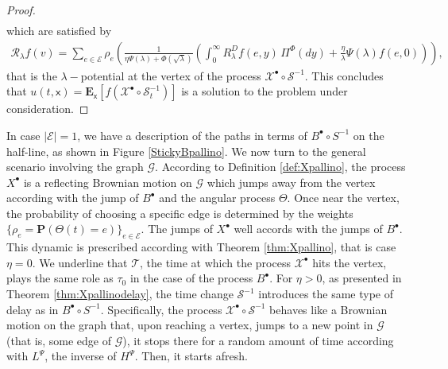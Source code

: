 \documentclass[11pt,a4paper]{article}
\theoremstyle{plain}
\theoremstyle{definition}
\theoremstyle{remark}
\begin{document}
\begin{proof}
\begin{align*}
			\end{align*}
			which are satisfied by
			\begin{align*}
				\mathcal{R}_\lambda f(v)= \sum_{e\in \mathcal{E}} \rho_e \left(\frac{1}{\eta \Psi(\lambda) +\Phi(\sqrt \lambda)} \left( \int_0^\infty R_\lambda^D f(e,y) \, \Pi^\Phi(dy) + \frac{\eta}{\lambda} \Psi(\lambda)f(e,0) \right)\right),
			\end{align*}
			that is the $\lambda-$potential at the vertex of the process $\mathcal{X}^\bullet \circ \mathcal{S}^{-1}$. This concludes that $u(t,\mathsf{x})=\mathbf{E}_\mathsf{x}[f(\mathcal{X}^\bullet \circ \mathcal{S}^{-1}_t)]$ is a solution to the problem under consideration.
		\end{proof}
		
		
		In case \( \vert \mathcal{E} \vert = 1 \), we have a description of the paths in terms of \( B^\bullet \circ S^{-1} \) on the half-line, as shown in Figure \ref{StickyBpallino}. We now turn to the general scenario involving the graph \( \mathcal{G} \). According to Definition \ref{def:Xpallino}, the process \( X^\bullet \) is a reflecting Brownian motion on \( \mathcal{G} \) which jumps away from the vertex according with the jump of $B^\bullet$ and the angular process $\Theta$. Once near the vertex, the probability of choosing a specific edge is determined by the weights \( \{\rho_e= \mathbf{P}(\Theta(t) = e)\}_{e \in \mathcal{E}} \). The jumps of $X^\bullet$ well accords with the jumps of \( B^\bullet \). This dynamic is prescribed according with Theorem \ref{thm:Xpallino}, that is case \( \eta = 0 \). We underline that \( \mathcal{T} \), the time at which the process \( \mathcal{X}^\bullet \) hits the vertex, plays the same role as \( \tau_0 \) in the case of the process \( B^\bullet \). For \( \eta > 0 \), as presented in Theorem \ref{thm:Xpallinodelay}, the time change \( \mathcal{S}^{-1} \) introduces the same type of delay as in \( B^\bullet \circ S^{-1} \). Specifically, the process \( \mathcal{X}^\bullet \circ \mathcal{S}^{-1} \) behaves like a Brownian motion on the graph that, upon reaching a vertex, jumps to a new point in \( \mathcal{G} \) (that is, some edge of $\mathcal{G}$), it stops there for a random amount of time according with \( L^\Psi \), the inverse of \( H^\Psi \). Then, it starts afresh.\\
		
\end{document}
